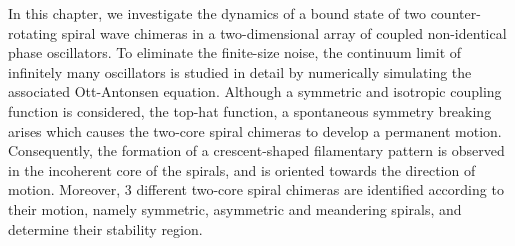 In this chapter, we investigate the dynamics of a bound state of two counter-rotating spiral wave chimeras
 in a two-dimensional array of coupled non-identical
phase oscillators. To eliminate the finite-size noise, the
continuum limit of infinitely many oscillators is studied in detail
by numerically simulating the
associated Ott-Antonsen equation. Although a symmetric and isotropic coupling function is considered,
the top-hat function, a spontaneous symmetry breaking arises which causes
the two-core spiral chimeras to develop a permanent motion. Consequently,
the formation of a crescent-shaped filamentary pattern is observed in the incoherent core
of the spirals, and is oriented towards the direction of motion.  Moreover, 3 
different two-core spiral chimeras are identified according to their motion, namely symmetric, asymmetric
and meandering spirals, and determine their stability region.


 








